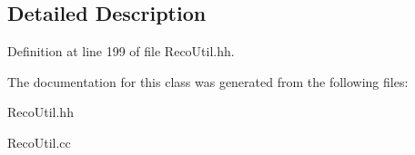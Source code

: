 \subsection{Detailed Description}


Definition at line 199 of file Reco\-Util.\-hh.



The documentation for this class was generated from the following files\-:\begin{DoxyCompactItemize}
\item 
Reco\-Util.\-hh\item 
Reco\-Util.\-cc\end{DoxyCompactItemize}
